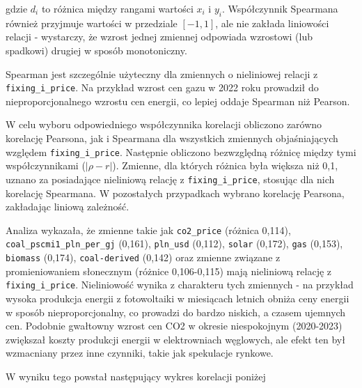 gdzie \( d_i \) to różnica między rangami wartości \( x_i \) i \( y_i \). Współczynnik Spearmana również przyjmuje wartości w przedziale \([-1, 1]\), ale nie zakłada liniowości relacji - wystarczy, że wzrost jednej zmiennej odpowiada wzrostowi (lub spadkowi) drugiej w sposób monotoniczny.

Spearman jest szczególnie użyteczny dla zmiennych o nieliniowej relacji z \texttt{fixing\_i\_price}. Na przykład wzrost cen gazu w 2022 roku prowadził do nieproporcjonalnego wzrostu cen energii, co lepiej oddaje Spearman niż Pearson.

W celu wyboru odpowiedniego współczynnika korelacji obliczono zarówno korelację Pearsona, jak i Spearmana dla wszystkich zmiennych objaśniających względem \texttt{fixing\_i\_price}. Następnie obliczono bezwzględną różnicę między tymi współczynnikami (\(| \rho - r |\)). Zmienne, dla których różnica była większa niż 0,1, uznano za posiadające nieliniową relację z \texttt{fixing\_i\_price}, stosując dla nich korelację Spearmana. W pozostałych przypadkach wybrano korelację Pearsona, zakładając liniową zależność. 

Analiza wykazała, że zmienne takie jak \texttt{co2\_price} (różnica 0,114), \texttt{coal\_pscmi1\_pln\_per\_gj} (0,161), \texttt{pln\_usd} (0,112), \texttt{solar} (0,172), \texttt{gas} (0,153), \texttt{biomass} (0,174), \texttt{coal-derived} (0,142) oraz zmienne związane z promieniowaniem słonecznym (różnice 0,106-0,115) mają nieliniową relację z \texttt{fixing\_i\_price}. Nieliniowość wynika z charakteru tych zmiennych - na przykład wysoka produkcja energii z fotowoltaiki w miesiącach letnich obniża ceny energii w sposób nieproporcjonalny, co prowadzi do bardzo niskich, a czasem ujemnych cen. Podobnie gwałtowny wzrost cen CO2 w okresie niespokojnym (2020-2023) zwiększał koszty produkcji energii w elektrowniach węglowych, ale efekt ten był wzmacniany przez inne czynniki, takie jak spekulacje rynkowe.

W wyniku tego powstał następujący wykres korelacji poniżej

